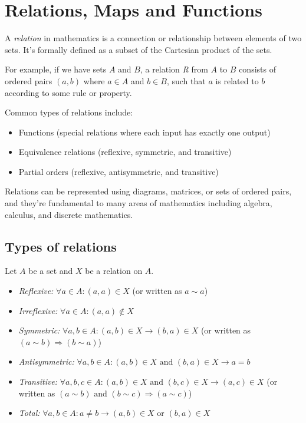\newpage
\section{Relations, Maps and Functions}

A \emph{relation} in mathematics is a connection or relationship between elements of two sets. It's 
formally defined as a subset of the Cartesian product of the sets.

For example, if we have sets \(A\) and \(B\), a relation \emph{R} from \(A\) to \(B\) consists
of ordered pairs \((a,b)\) where \(a \in A\) and \(b \in B\), such that \(a\) is related to \(b\) 
according to some rule or property.

Common types of relations include:

\begin{itemize}

	\item Functions (special relations where each input has exactly one output)

	\item Equivalence relations (reflexive, symmetric, and transitive)

	\item Partial orders (reflexive, antisymmetric, and transitive)

\end{itemize}

Relations can be represented using diagrams, matrices, or sets of
ordered pairs, and they're fundamental to many areas of mathematics including algebra, calculus, and 
discrete mathematics.

\subsection{Types of relations}

Let \(A\) be a set and \(X\) be a relation on \(A\).

\begin{itemize}

	\item \emph{Reflexive:} \(\forall a \in A: (a, a) \in X\) (or written as \(a \sim a\))

	\item \emph{Irreflexive:} \(\forall a \in A: (a, a) \not\in X\)

	\item \emph{Symmetric:} \(\forall a, b \in A: (a, b) \in X \to (b, a) \in X\) (or written as 
		  \((a \sim b) \Rightarrow (b \sim a)\))

	\item \emph{Antisymmetric:} \(\forall a, b \in A: (a, b) \in X \text{ and } (b, a) \in X \to a = b\)

	\item \emph{Transitive:} \(\forall a, b, c \in A: (a, b) \in X \text{ and } (b, c) \in X \to (a, c) 
		  \in X\) (or written as \((a \sim b) \text{ and } (b \sim c) \Rightarrow (a \sim c)\))

	\item \emph{Total:} \(\forall a,b \in A: a \neq b \to (a, b) \in X \text{ or } (b, a) \in X\)

\end{itemize}

